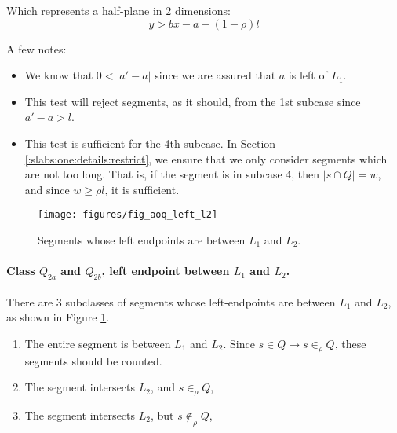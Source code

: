 Which represents a half-plane in 2 dimensions:
\[
y > bx - a - (1 - \rho)l 
\]

\noindent
A few notes: 
\begin{itemize}
 \item We know that $0 < |a' - a|$ since we are assured that $a$ is left of $L_1$.

 \item This test will reject segments, as it should, from the 1st subcase since $a' - a > l$.

 \item This test is sufficient for the 4th subcase. In Section \ref{:slabs:one:details:restrict}, we ensure that we only consider segments which are not too long.  That is, if the segment is in subcase 4, then $|s \cap Q| = w$, and since $w \geq \rho l$, it is sufficient.

\end{itemize}



\begin{figure}[t]
\begin{center}
  \texttt{[image: figures/fig\_aoq\_left\_l2]}
  \caption{Segments whose left endpoints are between $L_1$ and $L_2$.}
  \label{fig:slabs:one:aoq_left_l2}
\end{center}
\end{figure}

\paragraph{Class $Q_{2a}$ and $Q_{2b}$, left endpoint between $L_1$ and $L_2$.}
There are 3 subclasses of segments whose left-endpoints are between $L_1$ and $L_2$, as shown in Figure \ref{fig:slabs:one:aoq_left_l2}.

\begin{enumerate}
 \item The entire segment is between $L_1$ and $L_2$. Since $s \in Q \rightarrow s \in_\rho Q$, these segments should be counted.

 \item The segment intersects $L_2$, and $s \in_\rho Q$,

 \item The segment intersects $L_2$, but $s \not \in_\rho Q$,

\end{enumerate}

